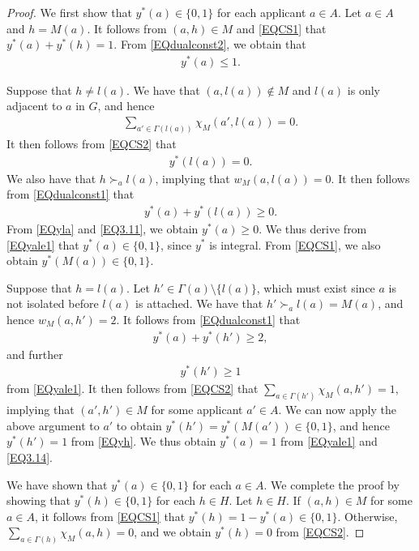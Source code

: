 \documentclass[10pt,a4paper]{amsart}
\begin{document}
\begin{proof}
    We first show that $y^*(a)\in \{0,1\}$ for each applicant $a\in A$. 
    Let $a\in A$ and $h=M(a)$. 
    It follows from $(a,h)\in M$ and \eqref{EQCS1} that $y^*(a)+y^*(h)=1$. 
    From \eqref{EQdualconst2}, we obtain that 
    \begin{align}
        \label{EQyale1}
        y^*(a)\leq 1. 
    \end{align} 

    Suppose that $h\neq l(a)$. 
    We have that $(a,l(a)) \not\in M$ and $l(a)$ is only adjacent to $a$ in $G$, 
    and hence 
    \begin{align*}
        \sum_{a'\in \Gamma(l(a))}\chi_M(a',l(a))= 0. 
    \end{align*}
    It then follows from \eqref{EQCS2} that 
    \begin{align}
    \label{EQyla}
        y^*(l(a))=0. 
    \end{align}
    We also have that 
    $h \succ_a l(a)$, 
    implying that $w_M(a,l(a))=0$. 
    It then follows from \eqref{EQdualconst1} that 
    \begin{align}
        \label{EQ3.11}
        y^*(a) + y^*(l(a)) \ge 0.
    \end{align}
    From \eqref{EQyla} and \eqref{EQ3.11}, 
    we obtain $y^*(a)\ge 0$. 
    We thus derive from \eqref{EQyale1} 
    that 
    $y^*(a)\in \{0,1\}$, 
    since $y^*$ is integral. 
    From \eqref{EQCS1}, 
    we also obtain $y^*(M(a)) \in \{0,1\}$. 

    Suppose that $h=l(a)$. 
    Let $h'\in \Gamma(a) \setminus \{l(a)\}$, 
    which must exist since $a$ is not isolated before $l(a)$ is attached. 
    We have that $h' \succ_a l(a)=M(a)$, and hence $w_M(a,h')=2$. 
    It follows from \eqref{EQdualconst1} that 
    \begin{align}
        \label{EQ3.14}
        y^*(a) + y^*(h')\ge 2, 
    \end{align}
    and further 
    \begin{align}
        \label{EQyh}
        y^*(h')\ge 1
    \end{align} from \eqref{EQyale1}. 
    It then follows from \eqref{EQCS2} that $\sum_{a\in \Gamma(h')}\chi_M(a,h')= 1$, 
    implying that $(a',h')\in M$ for some applicant $a'\in A$. 
    We can now apply the above argument to $a'$ to obtain $y^*(h')=y^*(M(a'))\in \{0,1\}$, 
    and hence $y^*(h')= 1$ from \eqref{EQyh}. 
    We thus obtain $y^*(a)= 1$ from \eqref{EQyale1} and \eqref{EQ3.14}. 

    We have shown that $y^*(a)\in \{0,1\}$ for each $a\in A$. 
    We complete the proof by showing that $y^*(h)\in \{0,1\}$ for each $h\in H$. 
    Let $h\in H$. 
    If $(a,h)\in M$ for some $a\in A$, 
    it follows from \eqref{EQCS1} that $y^*(h)=1-y^*(a)\in \{0,1\}$. 
    Otherwise, 
    $\sum_{a\in \Gamma(h)}\chi_M(a,h)= 0$, 
    and 
    we obtain $y^*(h)=0$ from \eqref{EQCS2}. 
\end{proof}
\end{document}
